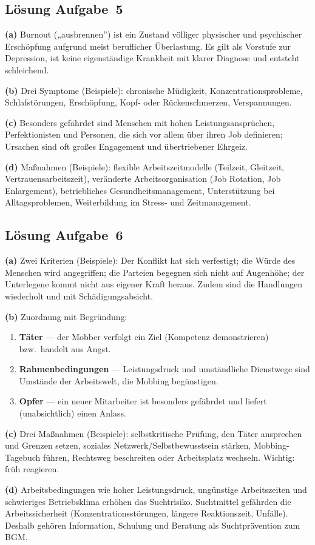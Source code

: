 \documentclass[11pt, a4paper]{article}
\begin{document}
\subsection*{Lösung Aufgabe~5}
\begin{loesung}
\textbf{(a)} Burnout („ausbrennen”) ist ein Zustand völliger physischer und psychischer
Erschöpfung aufgrund meist beruflicher Überlastung. Es gilt als Vorstufe zur Depression,
ist keine eigenständige Krankheit mit klarer Diagnose und entsteht schleichend.

\textbf{(b)} Drei Symptome (Beispiele): chronische Müdigkeit, Konzentrationsprobleme,
Schlafstörungen, Erschöpfung, Kopf- oder Rückenschmerzen, Verspannungen.

\textbf{(c)} Besonders gefährdet sind Menschen mit hohen Leistungsansprüchen,
Perfektionisten und Personen, die sich vor allem über ihren Job definieren; Ursachen sind
oft großes Engagement und übertriebener Ehrgeiz.

\textbf{(d)} Maßnahmen (Beispiele): flexible Arbeitszeitmodelle (Teilzeit, Gleitzeit,
Vertrauensarbeitszeit), veränderte Arbeitsorganisation (Job Rotation, Job Enlargement),
betriebliches Gesundheitsmanagement, Unterstützung bei Alltagsproblemen, Weiterbildung im
Stress- und Zeitmanagement.
\end{loesung}

\subsection*{Lösung Aufgabe~6}
\begin{loesung}
\textbf{(a)} Zwei Kriterien (Beispiele): Der Konflikt hat sich verfestigt; die Würde des
Menschen wird angegriffen; die Parteien begegnen sich nicht auf Augenhöhe; der Unterlegene
kommt nicht aus eigener Kraft heraus. Zudem sind die Handlungen wiederholt und mit
Schädigungsabsicht.

\textbf{(b)} Zuordnung mit Begründung:
\begin{enumerate}[label=\arabic*., itemsep=0pt]
  \item \textbf{Täter} --- der Mobber verfolgt ein Ziel (Kompetenz demonstrieren) bzw.\ handelt aus Angst.
  \item \textbf{Rahmenbedingungen} --- Leistungsdruck und umständliche Dienstwege sind Umstände der Arbeitswelt, die Mobbing begünstigen.
  \item \textbf{Opfer} --- ein neuer Mitarbeiter ist besonders gefährdet und liefert (unabsichtlich) einen Anlass.
\end{enumerate}

\textbf{(c)} Drei Maßnahmen (Beispiele): selbstkritische Prüfung, den Täter ansprechen und
Grenzen setzen, soziales Netzwerk/Selbstbewusstsein stärken, Mobbing-Tagebuch führen,
Rechtsweg beschreiten oder Arbeitsplatz wechseln. Wichtig: früh reagieren.

\textbf{(d)} Arbeitsbedingungen wie hoher Leistungsdruck, ungünstige Arbeitszeiten und
schwieriges Betriebsklima erhöhen das Suchtrisiko. Suchtmittel gefährden die
Arbeitssicherheit (Konzentrationsstörungen, längere Reaktionszeit, Unfälle). Deshalb
gehören Information, Schulung und Beratung als Suchtprävention zum BGM.
\end{loesung}
\end{document}

